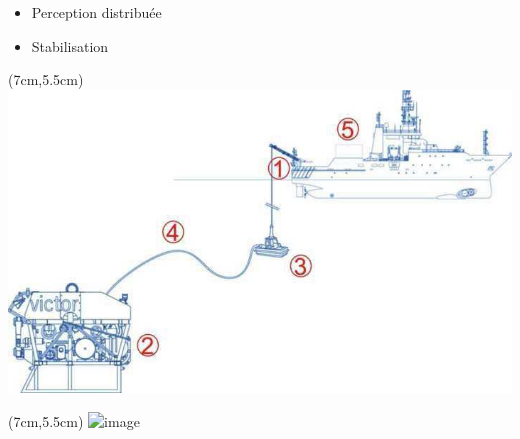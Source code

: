 \documentclass[10pt]{beamer}
\begin{document}
\begin{frame}
\begin{textblock*}{6 cm}
\begin{block}
\begin{itemize}
\item Perception distribuée \\
\item Stabilisation \\
\end{itemize}
\end{block}
\end{textblock*}
\begin{textblock*}{5.2cm}(7cm,5.5cm) %
\includegraphics[scale=0.2]{Pictures/these_ifremer.png}
\end{textblock*}
\begin{textblock*}{5.2cm}(7cm,5.5cm) %
\includegraphics<2->[scale=0.2]{Pictures/cordee.png}
\end{textblock*}
\end{frame}
\end{document}
